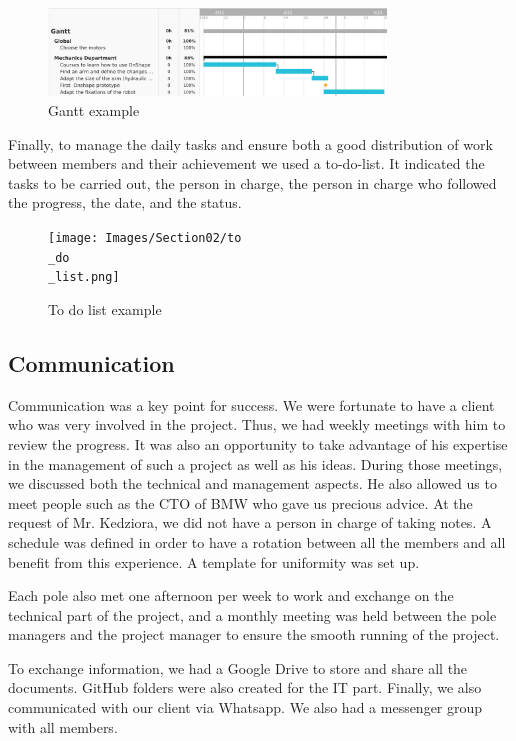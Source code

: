 \begin{figure}[ht]
    \centering
    \includegraphics[width=0.8\textwidth]{Images/Section02/gantt.png}
    \caption{Gantt example}
    \label{fig:GANTTextract}
\end{figure}
\FloatBarrier

\bigbreak
Finally, to manage the daily tasks and ensure both a good distribution of work between members and their achievement we used a to-do-list. It indicated the tasks to be carried out, the person in charge, the person in charge who followed the progress, the date, and the status. 

\begin{figure}[ht]
    \centering
    \texttt{[image: Images/Section02/to\\\_do\\\_list.png]}
    \caption{To do list example}
    \label{fig:ToDoList}
\end{figure}

\subsection{Communication}

Communication was a key point for success. We were fortunate to have a client who was very involved in the project. Thus, we had weekly meetings with him to review the progress. It was also an opportunity to take advantage of his expertise in the management of such a project as well as his ideas. During those meetings, we discussed both the technical and management aspects. He also allowed us to meet people such as the CTO of BMW who gave us precious advice. At the request of Mr. Kedziora, we did not have a person in charge of taking notes. A schedule was defined in order to have a rotation between all the members and all benefit from this experience. A template for uniformity was set up. 

\bigbreak
Each pole also met one afternoon per week to work and exchange on the technical part of the project, and a monthly meeting was held between the pole managers and the project manager to ensure the smooth running of the project. 

\bigbreak
To exchange information, we had a Google Drive to store and share all the documents. GitHub folders were also created for the IT part. Finally, we also communicated with our client via Whatsapp. We also had a messenger group with all members. 


